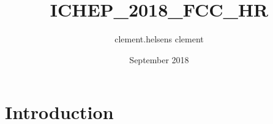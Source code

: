 \documentclass{article}
\title{ICHEP_2018_FCC_HR}
\author{clement.helsens clement}
\date{September 2018}
\begin{document}
\maketitle

\section{Introduction}
\end{document}
